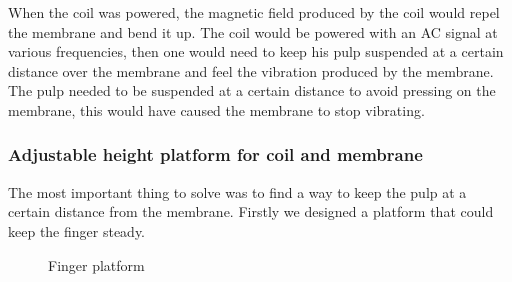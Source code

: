 When the coil was powered, the magnetic field produced by the coil would repel the membrane and bend it up.
The coil would be powered with an AC signal at various frequencies, then one would need to keep his pulp suspended at a certain distance over the membrane and feel the vibration produced by the membrane.
The pulp needed to be suspended at a certain distance to avoid pressing on the membrane, this would have caused the membrane to stop vibrating.

\subsubsection{Adjustable height platform for coil and membrane}
The most important thing to solve was to find a way to keep the pulp at a certain distance from the membrane.
Firstly we designed a platform that could keep the finger steady.
\begin{figure}
    \centering
    \caption{Finger platform}
    \label{fig: finger_platform}
\end{figure}

